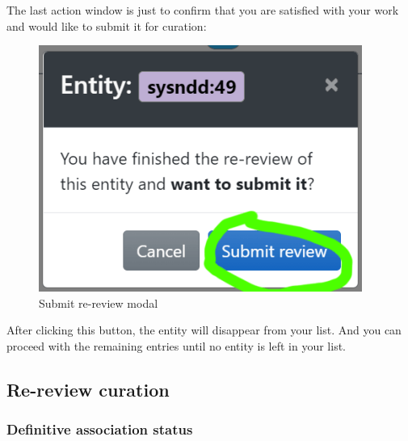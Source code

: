 \documentclass[
]{article}
\begin{document}
The last action window is just to confirm that you are satisfied with your work and would like to submit it for curation:

\begin{figure}
\centering
\includegraphics{./static/img/modal_submit_re-review.png}
\caption{Submit re-review modal}
\end{figure}

After clicking this button, the entity will disappear from your list. And you can proceed with the remaining entries until no entity is left in your list.

\hypertarget{re-review-curation}{%
\subsection{Re-review curation}\label{re-review-curation}}

\hypertarget{definitive-association-status}{%
\subsubsection{Definitive association status}\label{definitive-association-status}}
\end{document}
